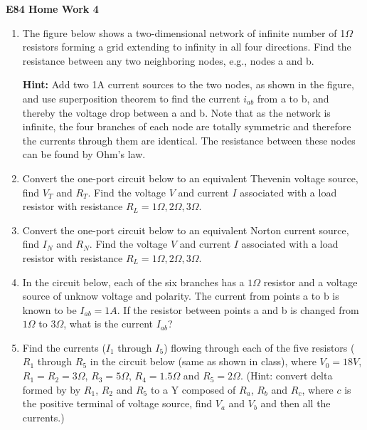 \usepackage{html}

\begin{center}
{\Large \bf E84 Home Work 4}
\end{center}
\begin{enumerate}

\item The figure below shows a two-dimensional network of infinite number 
of 1$\Omega$ resistors forming a grid extending to infinity in all four 
directions. Find the resistance between any two neighboring nodes, e.g., 
nodes a and b.


{\bf Hint:} Add two 1A current sources to the two nodes, as shown in the 
figure, and use superposition theorem to find the current $i_{ab}$ from 
a to b, and thereby the voltage drop between a and b. Note that as the
network is infinite, the four branches of each node are totally symmetric
and therefore the currents through them are identical. The resistance 
between these nodes can be found by Ohm's law.

\item Convert the one-port circuit below to an equivalent Thevenin voltage
source, find $V_T$ and $R_T$. Find the voltage $V$ and current $I$ associated
with a load resistor with resistance $R_L=1\Omega, 2\Omega, 3\Omega$.


\item Convert the one-port circuit below to an equivalent Norton current
source, find $I_N$ and $R_N$. Find the voltage $V$ and current $I$ associated
with a load resistor with resistance $R_L=1\Omega, 2\Omega, 3\Omega$.


\item In the circuit below, each of the six branches has a $1\Omega$
resistor and a voltage source of unknow voltage and polarity. The current
from points a to b is known to be $I_{ab}=1A$. If the resistor between 
points a and b is changed from $1\Omega$ to $3\Omega$, what is the current
$I_{ab}$?


\item Find the currents ($I_1$ through $I_5$) flowing through each of the 
five resistors ($R_1$ through $R_5$ in the circuit below (same as shown in
class), where $V_0=18V$, $R_1=R_2=3\Omega$, $R_3=5\Omega$, $R_4=1.5\Omega$
and $R_5=2\Omega$. (Hint: convert delta formed by by $R_1$, $R_2$ and $R_5$
to a Y composed of $R_a$, $R_b$ and $R_c$, where $c$ is the positive 
terminal of voltage source, find $V_a$ and $V_b$ and then all the currents.)


\end{enumerate}
